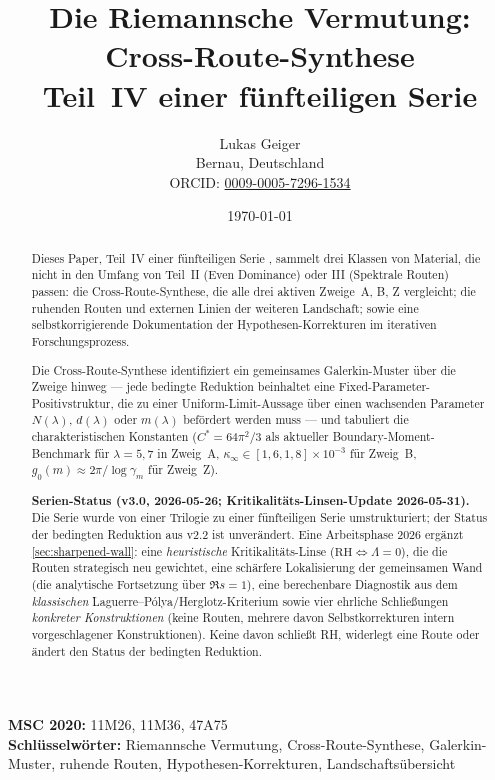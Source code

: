 \documentclass[12pt,a4paper]{article}
\title{Die Riemannsche Vermutung: Cross-Route-Synthese\\[4pt]
\large Teil~IV einer fünfteiligen Serie}
\author{Lukas Geiger\\
\small Bernau, Deutschland\\
\small ORCID: \href{https://orcid.org/0009-0005-7296-1534}{0009-0005-7296-1534}}
\date{\today}
\theoremstyle{definition}
\theoremstyle{remark}
\begin{document}
\overfullrule=0pt
\maketitle

\begin{abstract}\footnotesize
Dieses Paper, Teil~IV einer fünfteiligen Serie
\cite{Geiger2026partI,Geiger2026partII,Geiger2026partIII,Geiger2026partV},
sammelt drei Klassen von Material, die nicht in den Umfang von Teil~II
(Even Dominance) oder III (Spektrale Routen) passen: die Cross-Route-Synthese,
die alle drei aktiven Zweige~A, B, Z vergleicht; die ruhenden Routen und
externen Linien der weiteren Landschaft; sowie eine selbstkorrigierende
Dokumentation der Hypothesen-Korrekturen im iterativen Forschungsprozess.

Die Cross-Route-Synthese identifiziert ein gemeinsames Galerkin-Muster über
die Zweige hinweg --- jede bedingte Reduktion beinhaltet eine
Fixed-Parameter-Positivstruktur, die zu einer Uniform-Limit-Aussage über
einen wachsenden Parameter $N(\lambda)$, $d(\lambda)$ oder $m(\lambda)$
befördert werden muss --- und tabuliert die charakteristischen Konstanten
($C^* = 64\pi^2/3$ als aktueller Boundary-Moment-Benchmark für
$\lambda=5,7$ in Zweig~A, $\kappa_\infty \in [1{,}6,1{,}8]\times 10^{-3}$
für Zweig~B, $g_0(m) \approx 2\pi/\log\gamma_m$ für Zweig~Z).

\medskip\noindent
\textbf{Serien-Status (v3.0, 2026-05-26; Kritikalitäts-Linsen-Update 2026-05-31).}
Die Serie wurde von einer Trilogie zu einer fünfteiligen Serie umstrukturiert;
der Status der bedingten Reduktion aus v2.2 ist unverändert. Eine Arbeitsphase 2026
ergänzt \cref{sec:sharpened-wall}: eine \emph{heuristische} Kritikalitäts-Linse
($\mathrm{RH}\Leftrightarrow\Lambda=0$), die die Routen strategisch neu gewichtet,
eine schärfere Lokalisierung der gemeinsamen Wand (die analytische Fortsetzung über
$\Re s=1$), eine berechenbare Diagnostik aus dem \emph{klassischen}
Laguerre--P\'olya/Herglotz-Kriterium sowie vier ehrliche Schließungen
\emph{konkreter Konstruktionen} (keine Routen, mehrere davon Selbstkorrekturen
intern vorgeschlagener Konstruktionen). Keine davon schließt RH, widerlegt eine
Route oder ändert den Status der bedingten Reduktion.
\end{abstract}

{\footnotesize
\noindent\textbf{MSC 2020:} 11M26, 11M36, 47A75\\
\textbf{Schlüsselwörter:} Riemannsche Vermutung, Cross-Route-Synthese,
Galerkin-Muster, ruhende Routen, Hypothesen-Korrekturen,
Landschaftsübersicht
}
\end{document}
